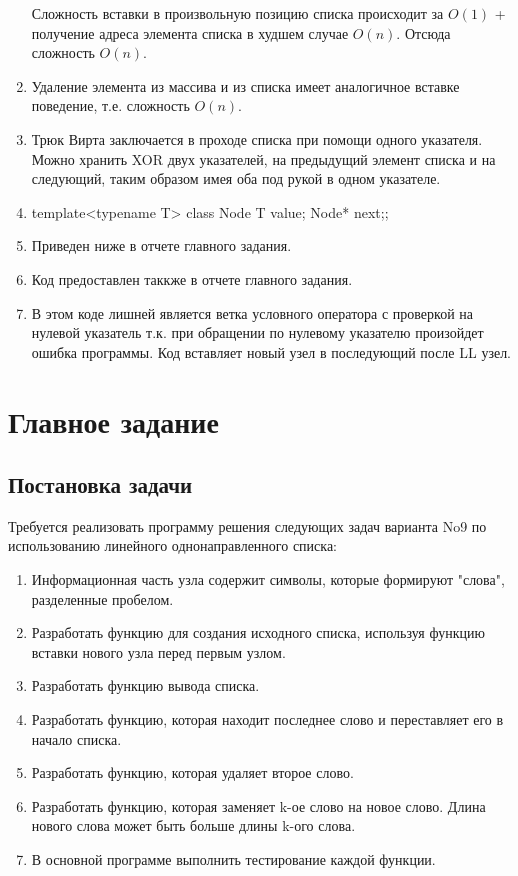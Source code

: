 \documentclass[a4paper, 14pt]{extarticle}
\begin{document}
\begin{enumerate}
  Сложность вставки в произвольную позицию списка происходит за
  $O(1)$ + получение адреса элемента списка в худшем случае  $O(n)$.
  Отсюда сложность  $O(n)$.
\item Удаление элемента из массива и из списка имеет аналогичное вставке
  поведение, т.е. сложность  $O(n)$. 
\item Трюк Вирта заключается в проходе списка при помощи одного
указателя. Можно хранить XOR двух указателей, на предыдущий
элемент списка и на следующий, таким образом имея оба под рукой в
одном указателе. %
\item template<typename T> class Node {T value; Node* next;};
\item Приведен ниже в отчете главного задания.
\item Код предоставлен таккже в отчете главного задания. 
\item В этом коде лишней является ветка условного оператора
  с проверкой на нулевой указатель т.к. при обращении по нулевому указателю
  произойдет ошибка программы. Код вставляет новый узел в последующий после
  LL узел.
\end{enumerate}

\section{Главное задание}
\subsection{Постановка задачи}
Требуется реализовать программу решения следующих задач варианта
No9 по использованию линейного однонаправленного списка:
\begin{enumerate}
  \item Информационная часть узла содержит символы, которые формируют "слова",
    разделенные пробелом.
  \item Разработать функцию для создания исходного списка, используя
функцию вставки нового узла перед первым узлом.
\item Разработать функцию вывода списка.
\item Разработать функцию, которая находит последнее слово и переставляет его в начало списка.
\item Разработать функцию, которая удаляет второе слово.
\item Разработать функцию, которая заменяет k-ое слово на новое слово. Длина нового слова
может быть больше длины k-ого слова.
\item В основной программе выполнить тестирование каждой функции.
\end{enumerate}
\end{document}
